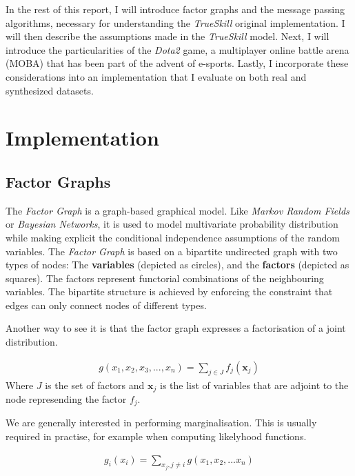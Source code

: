 \documentclass[10pt,a4]{article}
\begin{document}
In the rest of this report, I will introduce factor graphs and the message passing 
algorithms, necessary for understanding the \emph{TrueSkill\texttrademark}
original implementation. I will then describe the assumptions made in the 
\emph{TrueSkill\texttrademark} model. Next, I will introduce the particularities 
of the \emph{Dota2} game, a multiplayer online battle arena (MOBA) that has been 
part of the advent of e-sports. Lastly, I incorporate these considerations 
into an implementation that I evaluate on both real and synthesized datasets.

\section{Implementation} \label{impl}

\subsection{Factor Graphs}

The \emph{Factor Graph} is a graph-based graphical model. Like \emph{Markov Random Fields}
or \emph{Bayesian Networks}, it is used to model multivariate probability distribution 
while making explicit the conditional independence assumptions of the random variables.
The \emph{Factor Graph} is based on a bipartite undirected graph with two types of nodes:
The \textbf{variables} (depicted as circles), and the \textbf{factors} (depicted as squares).
The factors represent functorial combinations of the neighbouring variables. The 
bipartite structure is achieved by enforcing the constraint that edges can only
connect nodes of different types.

Another way to see it is that the factor graph expresses a factorisation of a 
joint distribution.

\begin{align*}
	g(x_1, x_2, x_3, ..., x_n)=\sum_{j \in J}f_j(\textbf{x}_j)
\end{align*}
Where $J$ is the set of factors and $\textbf{x}_j$ is the list of variables that 
are adjoint to the node represending the factor $f_j$.

We are generally interested in performing marginalisation. This is usually 
required in practise, for example when computing likelyhood functions.

\begin{align*}
	g_i(x_i) = \sum_{x_j, j \neq i}g(x_1, x_2, ... x_n)
\end{align*}
\end{document}
